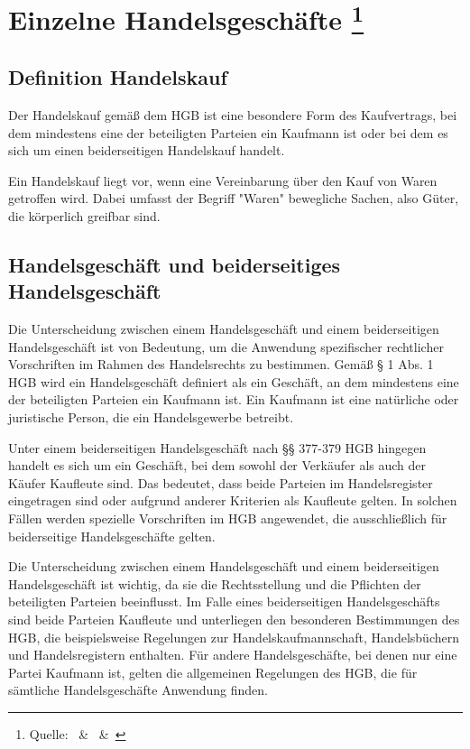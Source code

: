 
\chapter[Einzelne Handelsgeschäfte]{Einzelne Handelsgeschäfte \footnote{Quelle:~\cite{Handelsrecht} \&~\cite{Großkommentar_HGB} \&~\cite{handelskauf}}}

\section{Definition Handelskauf}
Der Handelskauf gemäß dem HGB ist eine besondere Form des Kaufvertrags, bei dem mindestens eine der beteiligten Parteien ein Kaufmann ist oder bei dem es sich um einen beiderseitigen Handelskauf handelt.

Ein Handelskauf liegt vor, wenn eine Vereinbarung über den Kauf von Waren getroffen wird. Dabei umfasst der Begriff "Waren" bewegliche Sachen, also Güter, die körperlich greifbar sind.


\section{Handelsgeschäft und beiderseitiges Handelsgeschäft}
Die Unterscheidung zwischen einem Handelsgeschäft und einem beiderseitigen Handelsgeschäft ist von Bedeutung, um die Anwendung spezifischer rechtlicher Vorschriften im Rahmen des Handelsrechts zu bestimmen. Gemäß § 1 Abs. 1 HGB wird ein Handelsgeschäft definiert als ein Geschäft, an dem mindestens eine der beteiligten Parteien ein Kaufmann ist. Ein Kaufmann ist eine natürliche oder juristische Person, die ein Handelsgewerbe betreibt.

Unter einem beiderseitigen Handelsgeschäft nach §§ 377-379 HGB hingegen handelt es sich um ein Geschäft, bei dem sowohl der Verkäufer als auch der Käufer Kaufleute sind. Das bedeutet, dass beide Parteien im Handelsregister eingetragen sind oder aufgrund anderer Kriterien als Kaufleute gelten. In solchen Fällen werden spezielle Vorschriften im HGB angewendet, die ausschließlich für beiderseitige Handelsgeschäfte gelten.

Die Unterscheidung zwischen einem Handelsgeschäft und einem beiderseitigen Handelsgeschäft ist wichtig, da sie die Rechtsstellung und die Pflichten der beteiligten Parteien beeinflusst. Im Falle eines beiderseitigen Handelsgeschäfts sind beide Parteien Kaufleute und unterliegen den besonderen Bestimmungen des HGB, die beispielsweise Regelungen zur Handelskaufmannschaft, Handelsbüchern und Handelsregistern enthalten. Für andere Handelsgeschäfte, bei denen nur eine Partei Kaufmann ist, gelten die allgemeinen Regelungen des HGB, die für sämtliche Handelsgeschäfte Anwendung finden.

